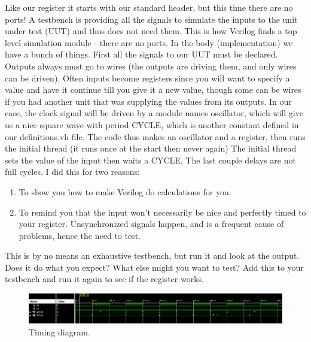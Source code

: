 
Like our register it starts with our standard header, but this time there are no ports!  A testbench is providing all the signals to simulate the inputs to the unit under test (UUT) and thus does not need them.  This is how Verilog finds a top level simulation module - there are no ports.  In the body (implementation) we have a bunch of things.  First all the signals to our UUT must be declared.  Outputs always must go to wires (the outputs are driving them, and only wires can be driven).  Often inputs become registers since you will want to specify a value and have it continue till you give it a new value, though some can be wires if you had another unit that was supplying the values from its outputs.  In our case, the clock signal will be driven by a module names oscillator, which will give us a nice square wave with period CYCLE, which is another constant defined in our definitions.vh file.  The code thus makes an oscillator and a register, then runs the initial thread (it runs once at the start then never again)  The initial thread sets the value of the input then waits a CYCLE.  The last couple delays are not full cycles.  I did this for two reasons:
\begin{enumerate}
\item To show you how to make Verilog do calculations for you.
\item To remind you that the input won't necessarily be nice and perfectly timed to your register.  Unsynchronized signals happen, and is a frequent cause of problems, hence the need to test.
\end{enumerate}
This is by no means an exhaustive testbench, but run it and look at the output.  Does it do what you expect?  What else might you want to test?  Add this to your testbench and run it again to see if the register works.



\begin{figure}
\caption{Timing diagram.}\label{fig:registertiming}
\begin{center}
\includegraphics[width=4.75in]{../images/registertiming.png}
\end{center}
\end{figure}

